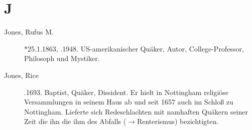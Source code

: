 \section*{J}

\articlesize

\begin{description}

 \item[Jones, Rufus M.] $\ast$25.1.1863, .1948. US-amerikanischer Quäker, Autor, College-Professor, Philosoph und Mystiker.

 \item[Jones, Rice] .1693. Baptist, Quäker, Dissident. Er hielt in Nottingham religiöse Versammlungen in seinem Haus ab und seit 1657 auch im Schloß zu Nottingham. Lieferte sich Redeschlachten mit namhaften Quäkern seiner Zeit die ihn die ihm des Abfalls ($\to$Renterismus) bezichtigten.

 \end{description}

\normalsize